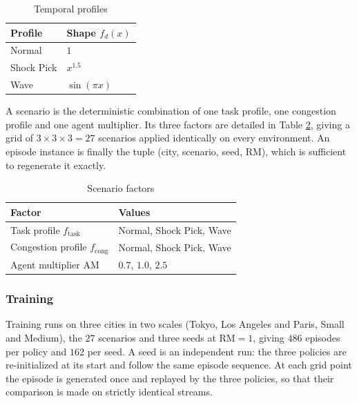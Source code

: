 \documentclass[sigconf]{acmart}
\begin{document}
\begin{table}[!htbp]
\centering
\caption{Temporal profiles}
\label{tab:profiles}
\scriptsize
\setlength{\tabcolsep}{3pt}
\renewcommand{\arraystretch}{1.2}
\begin{tabular}{@{}%
  >{\raggedright\hyphenpenalty=10000\arraybackslash}p{}%
  >{\raggedright\arraybackslash}p{}@{}}
\toprule
\textbf{Profile} & \textbf{Shape} $f_d(x)$ \\
\midrule
Normal     & $1$ \\
Shock Pick & $x^{1.5}$ \\
Wave       & $\sin(\pi x)$ \\
\bottomrule
\end{tabular}
\end{table}

A scenario is the deterministic combination of one task profile, one congestion profile and one agent multiplier. Its three factors are detailed in Table \ref{tab:eval-scenarios}, giving a grid of $3 \times 3 \times 3 = 27$ scenarios applied identically on every environment. An episode instance is finally the tuple (city, scenario, seed, $\mathrm{RM}$), which is sufficient to regenerate it exactly.

\begin{table}[!htbp]
\centering
\caption{Scenario factors}
\label{tab:eval-scenarios}
\scriptsize
\renewcommand{\arraystretch}{1.2}
\begin{tabular*}{\columnwidth}{@{\extracolsep{\fill}}ll@{}}
\toprule
\textbf{Factor} & \textbf{Values} \\
\midrule
Task profile $f_{\mathrm{task}}$       & Normal, Shock Pick, Wave \\
Congestion profile $f_{\mathrm{cong}}$ & Normal, Shock Pick, Wave \\
Agent multiplier $\mathrm{AM}$         & $0.7$, $1.0$, $2.5$ \\
\bottomrule
\end{tabular*}
\end{table}

\subsubsection{Training}

Training runs on three cities in two scales (Tokyo, Los Angeles and Paris, Small and Medium), the $27$ scenarios and three seeds at $\mathrm{RM} = 1$, giving $486$ episodes per policy and $162$ per seed. A seed is an independent run: the three policies are re-initialized at its start and follow the same episode sequence. At each grid point the episode is generated once and replayed by the three policies, so that their comparison is made on strictly identical streams.
\end{document}

